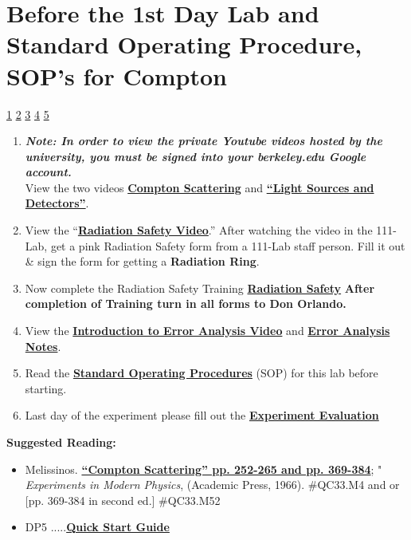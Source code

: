 \documentclass{../lab}
\begin{document}
\section{Before the 1st Day Lab and Standard Operating Procedure, SOP's for Compton}
\label{sec:BeforeTheLab}

\signatures \hyperlink{}{1} \hyperlink{}{2} \hyperlink{}{3} \hyperlink{}{4} \hyperlink{}{5} 

\begin{enumerate}
    \item \emph{\textbf{Note: In order to view the private Youtube videos hosted by the university, you must be signed into your berkeley.edu Google account.}} \\
    View the two videos \href{http://youtu.be/PVgqyf3kNRs}{\textbf{Compton Scattering}} and \href{http://youtu.be/lQKLakISoBA}{\textbf{``Light Sources and Detectors''}}.

    \item View the ``\href{http://youtu.be/KHxtzF5pZZM}{\textbf{Radiation Safety Video}}.'' After watching the video in the 111-Lab, get a pink Radiation Safety form from a 111-Lab staff person. Fill it out \& sign the form for getting a \textbf{Radiation Ring}.

    \item Now complete the Radiation Safety Training \href{http://experimentationlab.berkeley.edu/RadiationSafety}{\textbf{Radiation Safety}} \textbf{After completion of Training turn in all forms to Don Orlando.}

    \item View the \href{\ErrorAnalysisVideo}{\textbf{Introduction to Error Analysis Video}} and \href{\ErrorAnalysisNotes}{\textbf{\textbf{Error Analysis Notes}}}.

    \item Read the \href{http://experimentationlab.berkeley.edu/sites/default/files/images/SOP\_3271\_Cs-137\_Na-22\_Co-60\_Mn-54\_Am-241\_Fe-55\_2014.pdf}{\textbf{Standard Operating Procedures}} (SOP) for this lab before starting.

    \item Last day of the experiment please fill out the \href{\ExperimentEvaluation}{\textbf{Experiment Evaluation}}

\end{enumerate}

\textbf{Suggested Reading:}

\begin{itemize}
    \item Melissinos. \href{http://physics111.lib.berkeley.edu/Physics111/Reprints/COM/Melissinos\%201966\%20pg\%20252-265\%20and\%20369-384.pdf}{\textbf{``Compton Scattering'' pp. 252-265 and pp. 369-384}}; " \emph{Experiments in Modern Physics}, (Academic Press, 1966). \#QC33.M4 and or [pp. 369-384 in second ed.] \#QC33.M52

    \item DP5 .....\href{http://experimentationlab.berkeley.edu/sites/default/files/images/DP5\_Quick\_Start-Guide\_B0.pdf}{\textbf{Quick Start Guide}}

\end{itemize}
\end{document}
